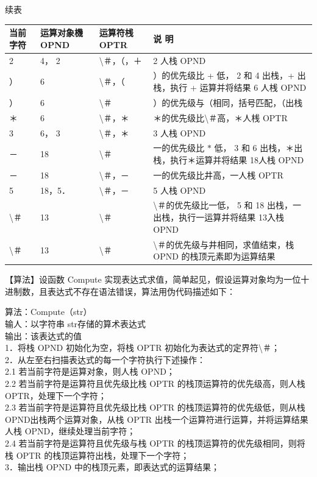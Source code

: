 \documentclass[10pt]{article}
\begin{document}
续表

\begin{center}
\begin{tabular}{|l|l|l|l|}
\hline
当前字符 & 运算对象機 OPND & 运算符桟 OPTR & 说 明 \\
\hline
2 & 4， 2 & \textbackslash ＃，（，＋ & 2 人栈 OPND \\
\hline
） & 6 & \textbackslash ＃，（ & ）的优先级比 + 低， 2 和 4 出栈，+ 出栈，执行 + 运算并将结果 6 人桟 OPND \\
\hline
） & 6 & \textbackslash ＃ & ）的优先级与（相同，括号匹配，（出栈 \\
\hline
＊ & 6 & \textbackslash ＃，＊ & ＊的优先级比\textbackslash ＃高，＊人桟 OPTR \\
\hline
3 & 6， 3 & \textbackslash ＃，＊ & 3 人栈 OPND \\
\hline
－ & 18 & \textbackslash ＃ & 一的优先级比 $*$ 低， 3 和 6 出栈，＊出栈，执行＊运算并将结果 18人栈 OPND \\
\hline
－ & 18 & \textbackslash ＃，－ & 一的优先级比井高，一人桟 OPTR \\
\hline
5 & 18，5． & \textbackslash ＃，－ & 5 人栈 OPND \\
\hline
\textbackslash ＃ & 13 & \textbackslash ＃ & \textbackslash ＃的优先级比一低， 5 和 18 出栈，一出栈，执行一运算并将结果 13入栈 OPND \\
\hline
\textbackslash ＃ & 13 & \textbackslash ＃ & \textbackslash ＃的优先级与井相同，求值结束，栈 OPND 的栈顶元素即为运算结果 \\
\hline
\end{tabular}
\end{center}

【算法】设函数 Compute 实现表达式求值，简单起见，假设运算对象均为一位十进制数，且表达式不存在语法错误，算法用伪代码描述如下：

算法：Compute（str）\\
输人：以字符串 str存储的算术表达式\\
输出：该表达式的值\\
1．将栈 OPND 初始化为空，将栈 OPTR 初始化为表达式的定界符\textbackslash ＃；\\
2．从左至右扫描表达式的每一个字符执行下述操作：\\
2.1 若当前字符是运算对象，则人栈 OPND；\\
2.2 若当前字符是运算符且优先级比栈 OPTR 的栈顶运算符的优先级高，则人栈 OPTR，处理下一个字符；\\
2.3 若当前字符是运算符且优先级比栈 OPTR 的栈顶运算符的优先级低，则从栈 OPND出栈两个运算对象，从栈 OPTR 出栈一个运算符进行运算，并将运算结果人栈 OPND，继续处理当前字符；\\
2.4 若当前字符是运算符且优先级与栈 OPTR 的栈顶运算符的优先级相同，则将栈 OPTR 的栈顶运算符出栈，处理下一个字符；\\
3．输出栈 OPND 中的栈顶元素，即表达式的运算结果；
\end{document}
